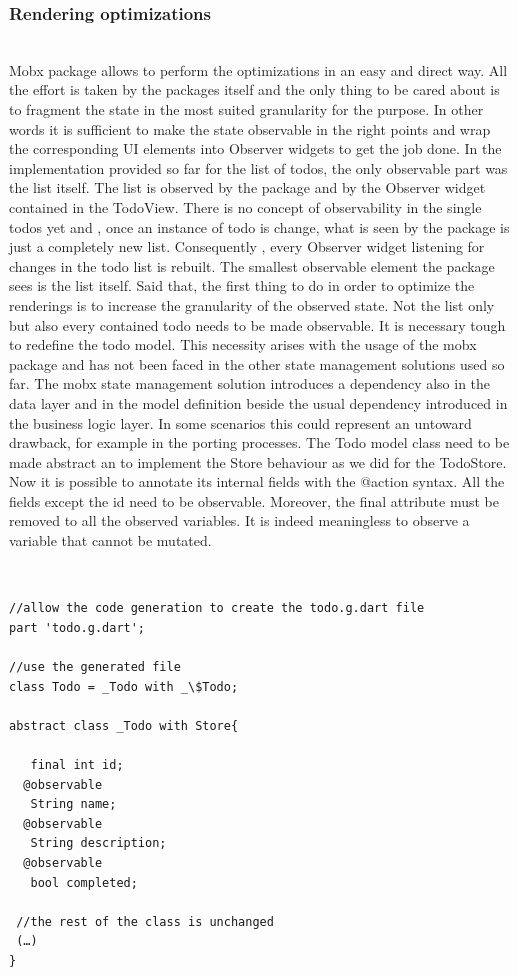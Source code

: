\subsubsection{Rendering optimizations} \mbox{}\\ \label{par:todo_app_inherited_widget_introduction}
Mobx package allows to perform the optimizations in an easy and direct way. All the effort is taken by the packages itself and the only thing to be cared about is to fragment the state in the most suited granularity for the purpose. In other words it is sufficient to make the state observable in the right points and wrap the corresponding UI elements into Observer widgets to get the job done. In the implementation provided so far for the list of todos, the only observable part was the list itself. The list is observed by the package and by the Observer widget contained in the TodoView. There is no concept of observability in the single todos yet and , once an instance of todo is change, what is seen by the package is just a completely new list. Consequently , every Observer widget listening for changes in the todo list is rebuilt. The smallest observable element the package sees is the list itself. Said that, the first thing to do in order to optimize the renderings is to increase the granularity of the observed state. Not the list only but also every contained todo needs to be made observable. It is necessary tough to redefine the todo model. This necessity arises with the usage of the mobx package and has not been faced in the other state management solutions used so far. The mobx state management solution introduces a dependency also in the data layer and in the model definition beside the usual dependency introduced in the business logic layer. In some scenarios this could represent an untoward drawback, for example in the porting processes. The Todo model class need to be made abstract an to implement the Store behaviour as we did for the TodoStore. Now it is possible to annotate its internal fields with the @action syntax. All the fields except the id need to be observable. Moreover, the final attribute must be removed to all the observed variables. It is indeed meaningless to observe a variable that cannot be mutated.
\begin{code}
\mbox{}\\
 \mbox{}
		\label{code:2.14}
\begin{verbatim}
//allow the code generation to create the todo.g.dart file
part 'todo.g.dart';

//use the generated file
class Todo = _Todo with _\$Todo;

abstract class _Todo with Store{

   final int id;
  @observable
   String name;
  @observable
   String description;
  @observable
   bool completed;
   
 //the rest of the class is unchanged
 (…)
}
\end{verbatim}
\mbox{}
\end{code}

